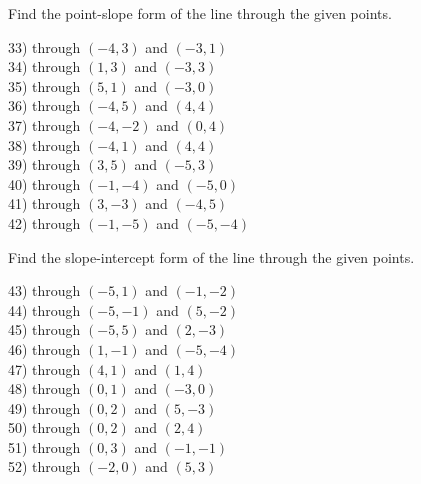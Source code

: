 \documentclass[12pt]{article}
\theoremstyle{definition}
\begin{document}
Find the point-slope form of the line through the given points.

\begin{multicols}{2}
  33) through $(- 4, 3)$ and $(- 3, 1)$\\
  34) through $(1, 3)$ and $(- 3, 3)$\\
  35) through $(5, 1)$ and $(- 3, 0)$\\
  36) through $(- 4, 5)$ and $(4, 4)$\\
  37) through $(- 4, - 2)$ and $(0, 4)$\\
  38) through $(- 4, 1)$ and $(4, 4)$\\
  39) through $(3, 5)$ and $(- 5, 3)$\\
  40) through $(- 1, - 4)$ and $(- 5, 0)$\\
  41) through $(3, - 3)$ and $(- 4, 5)$\\
  42) through $(- 1, - 5)$ and $(- 5, - 4)$
\end{multicols}

Find the slope-intercept form of the line through the given points.

\begin{multicols}{2}
  43) through $(- 5, 1)$ and $(- 1, - 2)$\\
  44) through $(- 5, - 1)$ and $(5, - 2)$\\
  45) through $(- 5, 5)$ and $(2, - 3)$\\
  46) through $(1, - 1)$ and $(- 5, - 4)$\\
  47) through $(4, 1)$ and $(1, 4)$\\
  48) through $(0, 1)$ and $(- 3, 0)$\\
  49) through $(0, 2)$ and $(5, - 3)$\\
  50) through $(0, 2)$ and $(2, 4)$\\
  51) through $(0, 3)$ and $(- 1, - 1)$\\
  52) through $(- 2, 0)$ and $(5, 3)$
\end{multicols}
\newpage
\ \newpage
\end{document}

